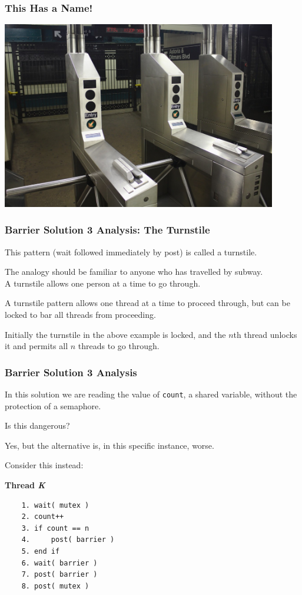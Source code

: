 \begin{frame}
	\frametitle{This Has a Name!}
	\begin{center}
		\includegraphics[width=0.9\textwidth]{images/nyc-subway-turnstile.jpg}
	\end{center}

\end{frame}


\begin{frame}
	\frametitle{Barrier Solution 3 Analysis: The Turnstile}

	This pattern (wait followed immediately by post) is called a \alert{turnstile}.

	The analogy should be familiar to anyone who has travelled by subway.\\
	\quad A turnstile allows one person at a time to go through.

	A turnstile pattern allows one thread at a time to proceed through, but can be locked to bar all threads from proceeding.

	Initially the turnstile in the above example is locked, and the $n$th thread unlocks it and permits all $n$ threads to go through.

\end{frame}

\begin{frame}[fragile]
	\frametitle{Barrier Solution 3 Analysis}

	In this solution we are reading the value of \texttt{count}, a shared variable, without the protection of a semaphore.

	Is this dangerous?

	Yes, but the alternative is, in this specific instance, worse.

	Consider this instead:

	\textbf{Thread \textit{K}}\vspace{-2em}
	\begin{verbatim}
	1. wait( mutex )
	2. count++
	3. if count == n
	4.     post( barrier )
	5. end if
	6. wait( barrier )
	7. post( barrier )
	8. post( mutex )
  \end{verbatim}
	\vspace{-2em}

\end{frame}

